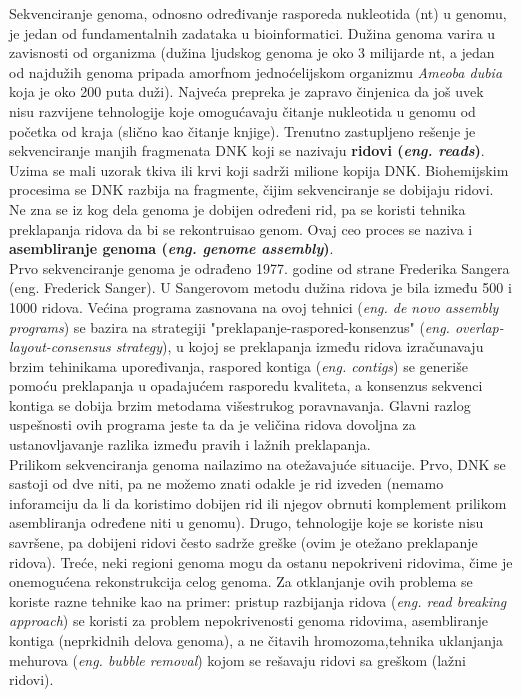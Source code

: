 \documentclass[a4paper]{article}
\begin{document}
{Sekvenciranje genoma, odnosno određivanje rasporeda nukleotida (nt) u genomu, je jedan od fundamentalnih zadataka u bioinformatici. Dužina genoma varira u zavisnosti od organizma (dužina ljudskog genoma je oko 3 milijarde nt, a jedan od najdužih genoma pripada amorfnom jednoćelijskom organizmu \textit{Ameoba dubia} koja je oko 200 puta duži). Najveća prepreka je zapravo činjenica da još uvek nisu razvijene tehnologije koje omogućavaju čitanje nukleotida u genomu od početka od kraja (slično kao čitanje knjige). Trenutno zastupljeno rešenje je sekvenciranje manjih fragmenata DNK koji se nazivaju \textbf{ridovi (\textit{eng. reads})}. Uzima se mali uzorak tkiva ili krvi koji sadrži milione kopija DNK. Biohemijskim procesima se DNK razbija na fragmente, čijim sekvenciranje se dobijaju ridovi. Ne zna se iz kog dela genoma je dobijen određeni rid, pa se koristi tehnika preklapanja ridova da bi se rekontruisao genom. Ovaj ceo proces se naziva i \textbf{asembliranje genoma (\textit{eng. genome assembly})}. \\
\indent Prvo sekvenciranje genoma je odrađeno 1977. godine od strane Frederika Sangera (eng. Frederick Sanger). U Sangerovom metodu dužina ridova je bila između 500 i 1000 ridova. Većina programa zasnovana na ovoj tehnici (\textit{eng. de novo assembly programs}) se bazira na strategiji "preklapanje-raspored-konsenzus" (\textit{eng. overlap-layout-consensus strategy}), u kojoj se preklapanja između ridova izračunavaju brzim tehinikama upore\-đivanja, raspored kontiga (\textit{eng. contigs}) se generiše pomoću preklapanja u opadajućem rasporedu kvaliteta, a konsenzus sekvenci kontiga se dobija brzim metodama višestrukog poravnavanja. Glavni razlog uspešnosti ovih programa jeste ta da je veličina ridova dovoljna za ustanovljavanje razlika između pravih i lažnih preklapanja. \\
\indent Prilikom sekvenciranja genoma nailazimo na otežavajuće situacije. Prvo, DNK se sastoji od dve niti, pa ne možemo znati odakle je rid izveden (nemamo inforamciju da li da koristimo dobijen rid ili njegov obrnuti komplement prilikom asembliranja određene niti u genomu). Drugo, tehnologije koje se koriste nisu savršene, pa dobijeni ridovi često sadrže greške (ovim je otežano preklapanje ridova). Treće, neki regioni genoma mogu da ostanu nepokriveni ridovima, čime je onemogućena rekonstrukcija celog genoma. Za otklanjanje ovih problema se koriste razne tehnike kao na primer: pristup razbijanja ridova (\textit{eng. read breaking 
approach}) se koristi za problem nepokrivenosti genoma ridovima, asembliranje kontiga (neprkidnih delova genoma), a ne čitavih hromozoma,tehnika uklanjanja mehurova (\textit{eng. bubble removal}) kojom se rešavaju ridovi sa greškom (lažni ridovi). \\
}
\end{document}
